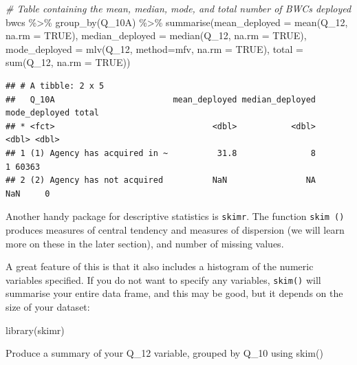 \documentclass[
]{book}
\newenvironment{Shaded}{\begin{snugshade}}{\end{snugshade}}
\newcommand{\AttributeTok}[1]{\textcolor[rgb]{0.77,0.63,0.00}{#1}}
\newcommand{\CommentTok}[1]{\textcolor[rgb]{0.56,0.35,0.01}{\textit{#1}}}
\newcommand{\ConstantTok}[1]{\textcolor[rgb]{0.00,0.00,0.00}{#1}}
\newcommand{\FunctionTok}[1]{\textcolor[rgb]{0.00,0.00,0.00}{#1}}
\newcommand{\NormalTok}[1]{#1}
\newcommand{\SpecialCharTok}[1]{\textcolor[rgb]{0.00,0.00,0.00}{#1}}
\newcommand{\StringTok}[1]{\textcolor[rgb]{0.31,0.60,0.02}{#1}}
\begin{document}
\begin{Shaded}
\begin{Highlighting}[]
\CommentTok{\# Table containing the mean, median, mode, and total number of BWCs deployed }
\NormalTok{bwcs }\SpecialCharTok{\%\textgreater{}\%}
  \FunctionTok{group\_by}\NormalTok{(Q\_10A) }\SpecialCharTok{\%\textgreater{}\%} 
  \FunctionTok{summarise}\NormalTok{(}\AttributeTok{mean\_deployed =} \FunctionTok{mean}\NormalTok{(Q\_12, }\AttributeTok{na.rm =} \ConstantTok{TRUE}\NormalTok{),}
            \AttributeTok{median\_deployed =} \FunctionTok{median}\NormalTok{(Q\_12, }\AttributeTok{na.rm =} \ConstantTok{TRUE}\NormalTok{), }
            \AttributeTok{mode\_deployed =} \FunctionTok{mlv}\NormalTok{(Q\_12, }\AttributeTok{method=}\StringTok{\textquotesingle{}mfv\textquotesingle{}}\NormalTok{, }\AttributeTok{na.rm =} \ConstantTok{TRUE}\NormalTok{), }
            \AttributeTok{total =} \FunctionTok{sum}\NormalTok{(Q\_12, }\AttributeTok{na.rm =} \ConstantTok{TRUE}\NormalTok{))}
\end{Highlighting}
\end{Shaded}

\begin{verbatim}
## # A tibble: 2 x 5
##   Q_10A                        mean_deployed median_deployed mode_deployed total
## * <fct>                                <dbl>           <dbl>         <dbl> <dbl>
## 1 (1) Agency has acquired in ~          31.8               8             1 60363
## 2 (2) Agency has not acquired          NaN                NA           NaN     0
\end{verbatim}

Another handy package for descriptive statistics is \texttt{skimr}. The function \texttt{skim\ ()} produces measures of central tendency and measures of dispersion (we will learn more on these in the later section), and number of missing values.

A great feature of this is that it also includes a histogram of the numeric variables specified. If you do not want to specify any variables, \texttt{skim()} will summarise your entire data frame, and this may be good, but it depends on the size of your dataset:

\begin{Shaded}
\begin{Highlighting}[]
\FunctionTok{library}\NormalTok{(skimr)}
\end{Highlighting}
\end{Shaded}

Produce a summary of your Q\_12 variable, grouped by Q\_10 using skim()
\end{document}
